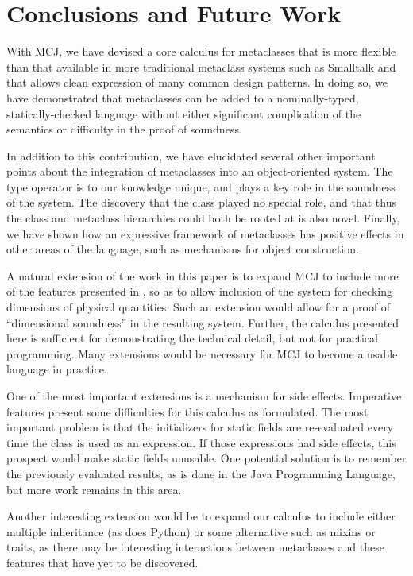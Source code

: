 \documentclass[10pt]{acm-sigplan}
\begin{document}
\section{Conclusions and Future Work}
\label{future}
With MCJ, we have devised a core calculus for metaclasses that is more
flexible than that available in more traditional metaclass systems
such as Smalltalk and that allows clean expression of many common
design patterns.  In doing so, we have demonstrated that metaclasses
can be added to a nominally-typed, statically-checked language without
either significant complication of the semantics or difficulty in the
proof of soundness.

In addition to this contribution, we have elucidated several other
important points about the integration of metaclasses into an
object-oriented system.  The {} type operator is to our
knowledge unique, and plays a key role in the soundness of the
system.  The discovery that the {} class played no special
role, and that thus the class and metaclass hierarchies could both be
rooted at {} is also novel.  Finally, we have shown how an
expressive framework of metaclasses has positive effects in other
areas of the language, such as mechanisms for object construction.  

A natural extension of the work in this paper is to expand MCJ to
include more of the features presented in \cite{DimUnits}, so as to
allow inclusion of the system for checking dimensions of physical
quantities. Such an extension would allow for a proof of  ``dimensional
soundness'' in the resulting system.  Further, the calculus presented
here is sufficient for demonstrating the technical detail, but not for
practical programming.  Many extensions would be necessary for MCJ to
become a usable language in practice.

One of the most important extensions is a mechanism for side effects.
Imperative features present some difficulties for this calculus as
formulated.  The most important problem is that the initializers for
static fields are re-evaluated every time the class is used as an
expression.  If those expressions had side effects, this prospect
would make static fields unusable.  One potential solution is to
remember the previously evaluated results, as is done in the Java
Programming Language, but more work remains in this area.

Another interesting extension would be to expand our calculus to
include either multiple inheritance (as does Python) or some
alternative such as mixins or traits, as there may be interesting
interactions between metaclasses and these features that have yet to
be discovered.
\end{document}
